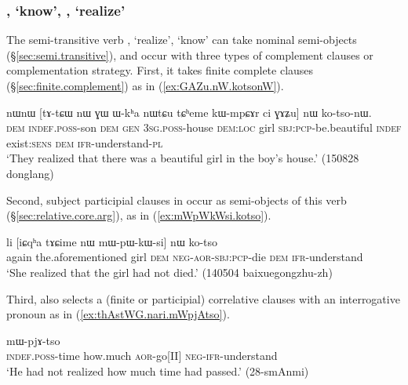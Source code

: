 \subsubsection{, `know', , `realize'} \label{sec:tso.sWXsAl}

The semi-transitive verb , `realize',  `know' can take nominal semi-objects (§\ref{sec:semi.transitive}), and occur with three types of complement clauses or complementation strategy. First, it takes finite complete clauses (§\ref{sec:finite.complement}) as in (\ref{ex:GAZu.nW.kotsonW}).

\begin{exe}
\ex \label{ex:GAZu.nW.kotsonW}
\gll  nɯnɯ [tɤ-tɕɯ nɯ ɣɯ ɯ-kʰa nɯtɕu tɕʰeme kɯ-mpɕɤr ci ɣɤʑu] nɯ ko-tso-nɯ. \\
\textsc{dem} \textsc{indef}.\textsc{poss}-son \textsc{dem} \textsc{gen} \textsc{3sg}.\textsc{poss}-house \textsc{dem}:\textsc{loc} girl \textsc{sbj}:\textsc{pcp}-be.beautiful \textsc{indef} exist:\textsc{sens} \textsc{dem} \textsc{ifr}-understand-\textsc{pl} \\
\glt `They realized that there was a beautiful girl in the boy's house.' (150828 donglang)
\end{exe}


Second, subject participial clauses in  occur as semi-objects of this verb (§\ref{sec:relative.core.arg}), as in (\ref{ex:mWpWkWsi.kotso}).

\begin{exe}
\ex \label{ex:mWpWkWsi.kotso}
\gll  li [iɕqʰa tɤɕime nɯ mɯ-pɯ-kɯ-si] nɯ ko-tso \\
again the.aforementioned girl \textsc{dem} \textsc{neg}-\textsc{aor}-\textsc{sbj}:\textsc{pcp}-die \textsc{dem} \textsc{ifr}-understand \\
\glt  `She realized that the girl had not died.' (140504 baixuegongzhu-zh)
\end{exe}

Third,  also selects a (finite or participial) correlative clauses with an interrogative pronoun as in (\ref{ex:thAstWG.nari.mWpjAtso}).

\begin{exe}
\ex \label{ex:thAstWG.nari.mWpjAtso}
 mɯ-pjɤ-tso \\
\textsc{indef}.\textsc{poss}-time how.much \textsc{aor}-go[II] \textsc{neg}-\textsc{ifr}-understand \\
\glt `He had not realized how much time had passed.' (28-smAnmi)
\end{exe}

